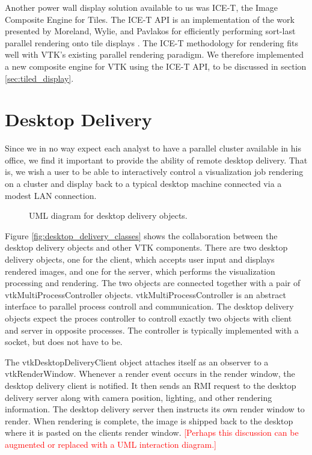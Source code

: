 \documentclass[twocolumn]{article}
\newcommand{\sticky}[1]{\textcolor{Red}{[#1]}}
\begin{document}
Another power wall display solution available to us was ICE-T, the Image
Composite Engine for Tiles.  The ICE-T API is an implementation of the work
presented by Moreland, Wylie, and Pavlakos for efficiently performing
sort-last parallel rendering onto tile displays \cite{Moreland01}.  The
ICE-T methodology for rendering fits well with VTK's existing parallel
rendering paradigm.  We therefore implemented a new composite engine for
VTK using the ICE-T API, to be discussed in section
\ref{sec:tiled_display}.


\section{Desktop Delivery}
\label{sec:desktop_delivery}

Since we in no way expect each analyst to have a parallel cluster available
in his office, we find it important to provide the ability of remote
desktop delivery.  That is, we wish a user to be able to interactively
control a visualization job rendering on a cluster and display back to a
typical desktop machine connected via a modest LAN connection.

\begin{figure*}[!t]
  \caption{UML diagram for desktop delivery objects.}
  \label{fig:desktop_delivery_classes}
\end{figure*}

Figure \vref{fig:desktop_delivery_classes} shows the collaboration between
the desktop delivery objects and other VTK components.  There are two
desktop delivery objects, one for the client, which accepts user input and
displays rendered images, and one for the server, which performs the
visualization processing and rendering.  The two objects are connected
together with a pair of vtkMultiProcessController objects.
vtkMultiProcessController is an abstract interface to parallel process
controll and communication.  The desktop delivery objects expect the proces
controller to controll exactly two objects with client and server in
opposite processes.  The controller is typically implemented with a socket,
but does not have to be.

The vtkDesktopDeliveryClient object attaches itself as an observer to a
vtkRenderWindow.  Whenever a render event occurs in the render window, the
desktop delivery client is notified.  It then sends an RMI request to the
desktop delivery server along with camera position, lighting, and other
rendering information.  The desktop delivery server then instructs its own
render window to render.  When rendering is complete, the image is shipped
back to the desktop where it is pasted on the clients render window.
\sticky{Perhaps this discussion can be augmented or replaced with a UML
interaction diagram.}
\end{document}
